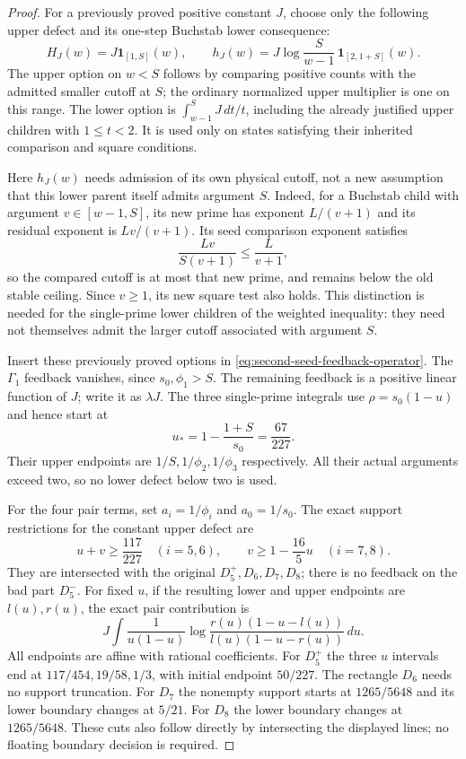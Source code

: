 \documentclass[11pt]{article}
\begin{document}
\begin{proof}
For a previously proved positive constant $J$, choose only the
following upper defect and its one-step Buchstab lower consequence:
\[
 H_J(w)=J\mathbf1_{[1,S]}(w),\qquad
 h_J(w)=J\log\frac{S}{w-1}\,\mathbf1_{[2,1+S]}(w).
\]
The upper option on $w<S$ follows by comparing positive counts
with the admitted smaller cutoff at $S$; the ordinary normalized
upper multiplier is one on this range. The lower option is
$\int_{w-1}^S J\,dt/t$, including the already justified upper
children with $1\le t<2$. It is used only on states satisfying
their inherited comparison and square conditions.

Here $h_J(w)$ needs admission of its own physical cutoff, not a
new assumption that this lower parent itself admits argument $S$.
Indeed, for a Buchstab child with argument $v\in[w-1,S]$, its new
prime has exponent $L/(v+1)$ and its residual exponent is
$Lv/(v+1)$. Its seed comparison exponent satisfies
\[
 \frac{Lv}{S(v+1)}\le\frac{L}{v+1},
\]
so the compared cutoff is at most that new prime, and remains
below the old stable ceiling. Since $v\ge1$, its new square test
also holds. This distinction is needed for the single-prime lower
children of the weighted inequality: they need not themselves
admit the larger cutoff associated with argument $S$.

Insert these previously proved options in
\eqref{eq:second-seed-feedback-operator}. The $\Gamma_1$ feedback
vanishes, since $s_0,\phi_1>S$. The remaining feedback is a positive
linear function of $J$; write it as $\lambda J$.
The three single-prime integrals use
$\rho=s_0(1-u)$ and hence start at
\[
 u_* = 1-\frac{1+S}{s_0}=\frac{67}{227}.
\]
Their upper endpoints are $1/S,1/\phi_2,1/\phi_3$ respectively.
All their actual arguments exceed two, so no lower defect below
two is used.

For the four pair terms, set $a_i=1/\phi_i$ and $a_0=1/s_0$.
The exact support restrictions for the constant upper defect are
\[
 u+v\ge\frac{117}{227}\quad(i=5,6),\qquad
 v\ge1-\frac{16}{5}u\quad(i=7,8).
\]
They are intersected with the original $D_5^+,D_6,D_7,D_8$;
there is no feedback on the bad part $D_5^-$.
For fixed $u$, if the resulting lower and upper endpoints are
$l(u),r(u)$, the exact pair contribution is
\[
 J\int \frac{1}{u(1-u)}
 \log\frac{r(u)(1-u-l(u))}{l(u)(1-u-r(u))}\,du.
\]
All endpoints are affine with rational coefficients. For $D_5^+$
the three $u$ intervals end at $117/454,19/58,1/3$, with initial
endpoint $50/227$. The rectangle $D_6$ needs no support truncation.
For $D_7$ the nonempty support starts at $1265/5648$ and its lower
boundary changes at $5/21$. For $D_8$ the lower boundary changes
at $1265/5648$. These cuts also follow directly by intersecting
the displayed lines; no floating boundary decision is required.


\end{proof}
\end{document}

